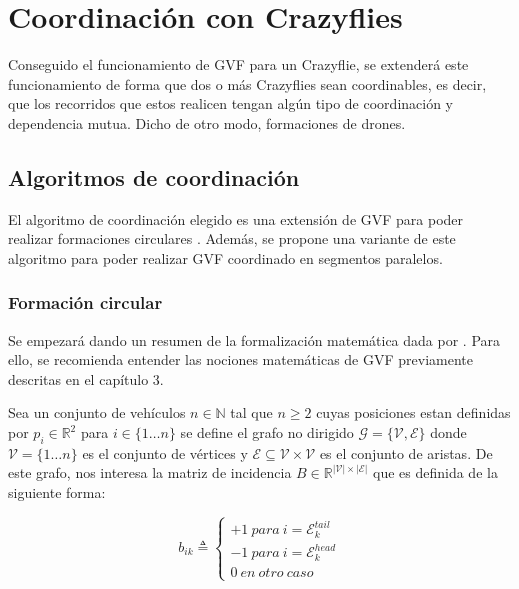 \chapter{Coordinación con Crazyflies}

Conseguido el funcionamiento de GVF para un Crazyflie, 
se extenderá este funcionamiento de forma que dos o más Crazyflies sean coordinables,
es decir, que los recorridos que estos realicen tengan algún tipo de coordinación y dependencia mutua. Dicho de otro modo, formaciones de drones.


\section{Algoritmos de coordinación}

El algoritmo de coordinación elegido es una extensión de GVF para 
poder realizar formaciones circulares \cite{circular-formations}.
Además, se propone una variante de este algoritmo para poder realizar 
GVF coordinado en segmentos paralelos.

\subsection{Formación circular}

Se empezará dando un resumen de la formalización matemática dada por \cite{circular-formations}.
Para ello, se recomienda entender las nociones matemáticas de GVF previamente descritas en el capítulo 3.

Sea un conjunto de vehículos $n \in \mathbb{N}$ tal que $n \geq 2$ cuyas posiciones estan definidas por
$p_i \in \mathbb{R}^2$ para $i \in \{1 \ldots n\}$ se define el grafo no dirigido
$\mathcal{G} = \{\mathcal{V}, \mathcal{E}\}$ donde $\mathcal{V} = \{1 \ldots n \}$ es el conjunto de vértices
y $\mathcal{E} \subseteq \mathcal{V} \times \mathcal{V}$ es el conjunto de aristas.
De este grafo, nos interesa la  matriz de incidencia 
$B \in \mathbb{R}^{|\mathcal{V}| \times |\mathcal{E}|}$ que es definida de la siguiente forma:

\begin{equation}
    b_{ik} \triangleq 
    \begin{cases} 
        +1 \ para \ i = \mathcal{E}^{tail}_{k} \\
        -1 \ para \ i = \mathcal{E}^{head}_{k}  \\
        0 \ en \ otro \ caso
    \end{cases}
\end{equation}

